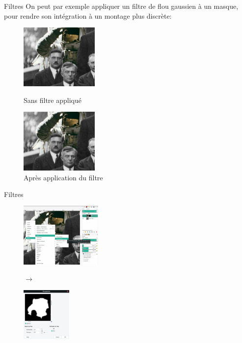 \documentclass[10pt,svgnames,usenames,table]{beamer}
\begin{document}
\begin{frame}{Filtres}
		On peut par exemple appliquer un filtre de flou gaussien à un masque, pour rendre son intégration à un montage plus discrète:
		\begin{figure}[H]
			\centering
			\begin{minipage}{.5\textwidth}
				\centering
				\includegraphics[height=120px]{Images/filters/astro0} 
				\caption{Sans filtre appliqué}
			\end{minipage}%
			\begin{minipage}{.5\textwidth}
				\centering
				\includegraphics[height=120px]{Images/filters/astro1} 
				\caption{Après application du filtre}
			\end{minipage}
		\end{figure}	
\end{frame}	


	\begin{frame}{Filtres}
		\begin{figure}[H]
			\centering
			\begin{minipage}{.6\textwidth}
				\centering
				\includegraphics[height=120px]{Images/filters/astroBlur} 
				\end{minipage}$\rightarrow$%
			\begin{minipage}{.4\textwidth}
				\centering
				\includegraphics[height=100px]{Images/filters/gaussBlur} 
				\end{minipage}

			\end{figure}	
	\end{frame}
\end{document}
